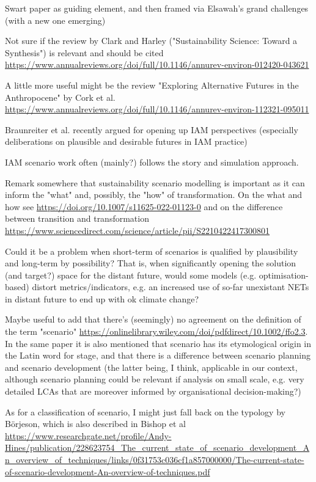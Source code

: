 \documentclass{article}
\begin{document}
Swart paper as guiding element, and then framed via Elsawah's grand challenges (with a new one emerging)

Not sure if the review by Clark and Harley ("Sustainability Science: Toward a Synthesis") is relevant and should be cited \url{https://www.annualreviews.org/doi/full/10.1146/annurev-environ-012420-043621}

A little more useful might be the review "Exploring Alternative Futures in the Anthropocene" by Cork et al. \url{https://www.annualreviews.org/doi/full/10.1146/annurev-environ-112321-095011}

Braunreiter et al. recently argued for opening up IAM perspectives (especially deliberations on plausible and desirable futures in IAM practice)

IAM scenario work often (mainly?) follows the story and simulation approach.

Remark somewhere that sustainability scenario modelling is important as it can inform the "what" and, possibly, the "how" of transformation. On the what and how see \url{https://doi.org/10.1007/s11625-022-01123-0} and on the difference between transition and transformation \url{https://www.sciencedirect.com/science/article/pii/S2210422417300801}

Could it be a problem when short-term of scenarios is qualified by plausibility and long-term by possibility? That is, when significantly opening the solution (and target?) space for the distant future, would some models (e.g. optimisation-based) distort metrics/indicators, e.g. an increased use of so-far unexistant NETs in distant future to end up with ok climate change?

Maybe useful to add that there's (seemingly) no agreement on the definition of the term "scenario" \url{https://onlinelibrary.wiley.com/doi/pdfdirect/10.1002/ffo2.3}. In the same paper it is also mentioned that scenario has its etymological origin in the Latin word for stage, and that there is a difference between scenario planning and scenario development (the latter being, I think, applicable in our context, although scenario planning could be relevant if analysis on small scale, e.g. very detailed LCAs that are moreover informed by organisational decision-making?)

As for a classification of scenario, I might just fall back on the typology by Börjeson, which is also described in Bishop et al \url{https://www.researchgate.net/profile/Andy-Hines/publication/228623754_The_current_state_of_scenario_development_An_overview_of_techniques/links/0f31753c036cf1a857000000/The-current-state-of-scenario-development-An-overview-of-techniques.pdf}
\end{document}
